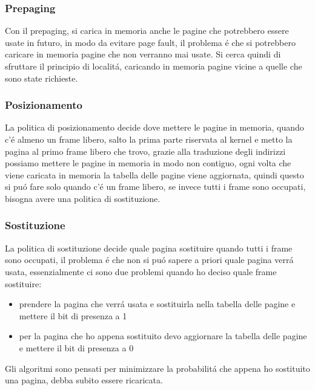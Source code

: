     \subsubsection*{Prepaging}
    Con il prepaging, si carica in memoria anche le pagine che potrebbero essere usate in futuro, in modo da evitare
    page fault, il problema é che si potrebbero caricare in memoria pagine che non verranno mai usate. Si cerca quindi
    di sfruttare il principio di localitá, caricando in memoria pagine vicine a quelle che sono state richieste.
    \subsubsection{Posizionamento}
    La politica di posizionamento decide dove mettere le pagine in memoria, quando c'é almeno un frame libero, salto la prima
    parte riservata al kernel e metto la pagina al primo frame libero che trovo, grazie alla traduzione degli indirizzi
    possiamo mettere le pagine in memoria in modo non contiguo, ogni volta che viene caricata in memoria la tabella delle pagine viene
    aggiornata, quindi questo si puó fare solo quando c'é un frame libero, se invece tutti i frame sono occupati, bisogna
    avere una politica di sostituzione.
    \subsubsection{Sostituzione}
    La politica di sostituzione decide quale pagina sostituire quando tutti i frame sono occupati, il problema é che
    non si puó sapere a priori quale pagina verrá usata, essenzialmente ci sono due problemi quando ho deciso quale frame
    sostituire:
    \begin{itemize}
        \item prendere la pagina che verrá usata e sostituirla nella tabella delle pagine e mettere il bit di presenza a 1
        \item per la pagina che ho appena sostituito devo aggiornare la tabella delle pagine e mettere il bit di presenza a 0
    \end{itemize}
    Gli algoritmi sono pensati per minimizzare la probabilitá che appena ho sostituito una pagina, debba subito essere
    ricaricata.
